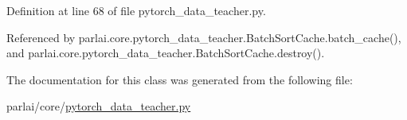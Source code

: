 Definition at line 68 of file pytorch\+\_\+data\+\_\+teacher.\+py.



Referenced by parlai.\+core.\+pytorch\+\_\+data\+\_\+teacher.\+Batch\+Sort\+Cache.\+batch\+\_\+cache(), and parlai.\+core.\+pytorch\+\_\+data\+\_\+teacher.\+Batch\+Sort\+Cache.\+destroy().



The documentation for this class was generated from the following file\+:\begin{DoxyCompactItemize}
\item 
parlai/core/\hyperlink{pytorch__data__teacher_8py}{pytorch\+\_\+data\+\_\+teacher.\+py}\end{DoxyCompactItemize}
